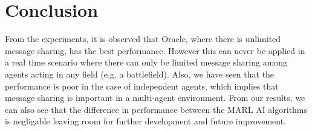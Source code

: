 \section{Conclusion}
From the experiments, it is observed that Oracle, where there is unlimited message sharing, has the best performance. However this can never be applied in a real time scenario where there can only be limited message sharing among agents acting in any field (e.g. a battlefield). Also, we have seen that the performance is poor in the case of independent agents, which implies that message sharing is important in a multi-agent environment. From our results, we can also see that the difference in performance between the MARL AI algorithms is negligable leaving room for further development and future improvement.

\vspace{-.2 cm}
 \endinput